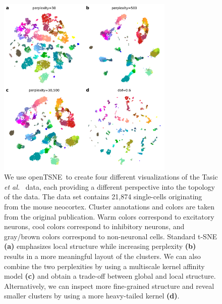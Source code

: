 \documentclass[letter]{article}
\newcommand{\opentsne}{\textsf{openTSNE}}
\begin{document}
\begin{figure}[htbp]
  \center
  \includegraphics[width=0.75\textwidth]{tasic2018}
	\caption{\label{fig:tasic}
  We use \opentsne\ to create four different
	visualizations of the Tasic \textit{et al.}~\cite{tasic2018shared} data,
	each providing a different perspective into the topology of the data.
	The data set contains 21,874 single-cells originating from the mouse
	neocortex. Cluster annotations and colors are taken from the original
	publication. Warm colors correspond to excitatory neurons, cool colors
	correspond to inhibitory neurons, and gray/brown colors correspond to
	non-neuronal cells. Standard t-SNE \textbf{(a)} emphasizes local
	structure while increasing perplexity \textbf{(b)} results in a more
	meaningful layout of the clusters. We can also combine the two
	perplexities by using a multiscale kernel affinity model \textbf{(c)}
	and obtain a trade-off between global and local structure.
	Alternatively, we can inspect more fine-grained structure and reveal
  smaller clusters by using a more heavy-tailed kernel \textbf{(d)}.}
\end{figure}
\end{document}

